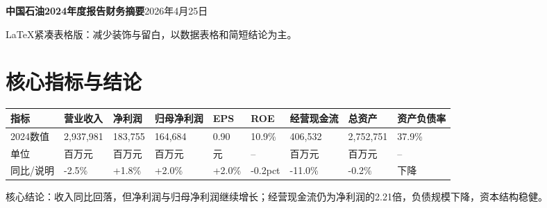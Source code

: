 \documentclass[9pt,a4paper]{ctexart}
\newcommand{\smallnote}[1]{{\scriptsize\color{Gray}#1}}
\begin{document}
\thispagestyle{fancy}

{\Large\bfseries 中国石油2024年度报告财务摘要}\hfill {\small 2026年4月25日}\par
{\color{Gray}\small LaTeX紧凑表格版：减少装饰与留白，以数据表格和简短结论为主。}\par
\vspace{2mm}

\section{核心指标与结论}
\small
\begin{tabularx}{\textwidth}{@{}lYYYYYYYY@{}}
\toprule
指标 & 营业收入 & 净利润 & 归母净利润 & EPS & ROE & 经营现金流 & 总资产 & 资产负债率 \\
\midrule
2024数值 & 2,937,981 & 183,755 & 164,684 & 0.90 & 10.9\% & 406,532 & 2,752,751 & 37.9\% \\
单位 & 百万元 & 百万元 & 百万元 & 元 & -- & 百万元 & 百万元 & -- \\
同比/说明 & -2.5\% & +1.8\% & +2.0\% & +2.0\% & -0.2pct & -11.0\% & -0.2\% & 下降 \\
\bottomrule
\end{tabularx}
\normalsize
\smallnote{核心结论：收入同比回落，但净利润与归母净利润继续增长；经营现金流仍为净利润的2.21倍，负债规模下降，资本结构稳健。}
\end{document}
